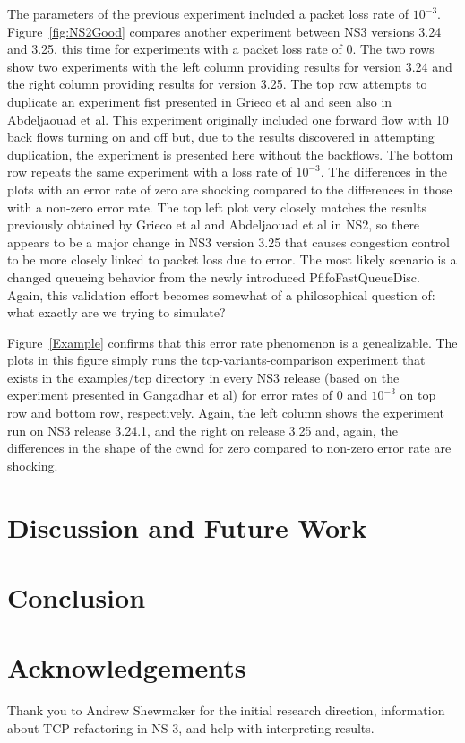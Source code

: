 \documentclass[conference]{IEEEtran}
\begin{document}
The parameters of the previous experiment included a packet loss rate of $10^{-3}$. Figure~\ref{fig:NS2Good} compares another experiment between NS3 versions 3.24 and 3.25, this time for experiments with a packet loss rate of 0. The two rows show two experiments with the left column providing results for version 3.24 and the right column providing results for version 3.25. The top row attempts to duplicate an experiment fist presented in Grieco et al\cite{NS2WP} and seen also in Abdeljaouad et al\cite{NS2Val}. This experiment originally included one forward flow with 10 back flows turning on and off but, due to the results discovered in attempting duplication, the experiment is presented here without the backflows. The bottom row repeats the same experiment with a loss rate of $10^{-3}$. The differences in the plots with an error rate of zero are shocking compared to the differences in those with a non-zero error rate. The top left plot very closely matches the results previously obtained by Grieco et al\cite{NS2WP} and Abdeljaouad et al\cite{NS2Val} in NS2, so there appears to be a major change in NS3 version 3.25 that causes congestion control to be more closely linked to packet loss due to error. The most likely scenario is a changed queueing behavior from the newly introduced PfifoFastQueueDisc. Again, this validation effort becomes somewhat of a philosophical question of: what exactly are we trying to simulate? 

Figure~\ref{Example} confirms that this error rate phenomenon is a genealizable. The plots in this figure simply runs the tcp-variants-comparison experiment that exists in the examples/tcp directory in every NS3 release (based on the experiment presented in Gangadhar et al\cite{NS3W}) for error rates of 0 and $10^{-3}$ on top row and bottom row, respectively. Again, the left column shows the experiment run on NS3 release 3.24.1, and the right on release 3.25 and, again, the differences in the shape of the cwnd for zero compared to non-zero error rate are shocking.  

\section{Discussion and Future Work} 

\section{Conclusion} 

\section{Acknowledgements}

Thank you to Andrew Shewmaker for the initial research direction, information about TCP refactoring in NS-3, and help with interpreting results. 

{\small {}
}
\end{document}
